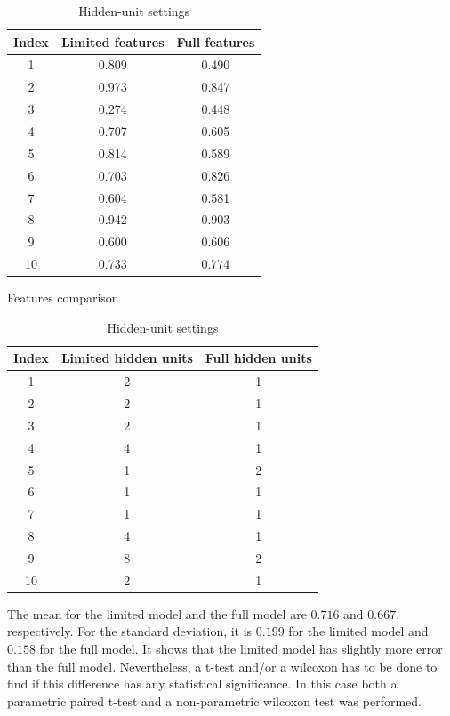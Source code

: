 \documentclass[12pt]{article}
\begin{document}
\begin{table}[ht]
\centering
\begin{minipage}[t]{0.49\textwidth}
  \centering
  \begin{tabular}{c c c}
    \hline
    Index & Limited features & Full features \\
    \hline
    1  & 0.809 & 0.490 \\
    2  & 0.973 & 0.847 \\
    3  & 0.274 & 0.448 \\
    4  & 0.707 & 0.605 \\
    5  & 0.814 & 0.589 \\
    6  & 0.703 & 0.826 \\
    7  & 0.604 & 0.581 \\
    8  & 0.942 & 0.903 \\
    9  & 0.600 & 0.606 \\
    10 & 0.733 & 0.774 \\
    \hline
  \end{tabular}
  \caption{Features comparison}
  \label{tab:features}
\end{minipage}
\hfill
\begin{minipage}[t]{0.50\textwidth}
  \centering
  \begin{tabular}{c c c}
    \hline
    Index & Limited hidden units & Full hidden units \\
    \hline
    1  & 2 & 1 \\
    2  & 2 & 1 \\
    3  & 2 & 1 \\
    4  & 4 & 1 \\
    5  & 1 & 2 \\
    6  & 1 & 1 \\
    7  & 1 & 1 \\
    8  & 4 & 1 \\
    9  & 8 & 2 \\
    10 & 2 & 1 \\
    \hline
  \end{tabular}
  \caption{Hidden-unit settings}
  \label{tab:hidden}
\end{minipage}
\end{table}

The mean for the limited model and the full model are $0.716$ and $0.667$, respectively.
For the standard deviation, it is $0.199$ for the limited model and $0.158$ for the full model.
It shows that the limited model has slightly more error than the full model. 
Nevertheless, a t-test and/or a wilcoxon has to be done to find if this difference has any statistical significance.
In this case both a parametric paired t-test and a non-parametric wilcoxon test was performed.
\end{document}
